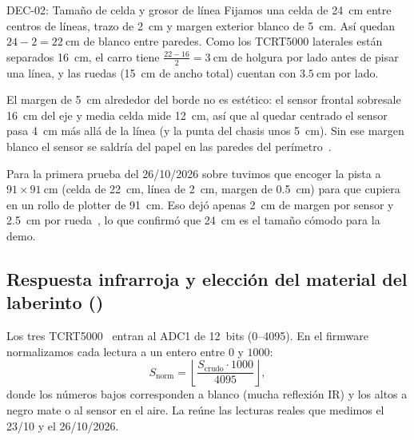 \begin{decision}{DEC-02: Tamaño de celda y grosor de línea}
Fijamos una celda de \SI{24}{\centi\meter} entre centros de líneas, trazo de \SI{2}{\centi\meter} y margen exterior blanco de \SI{5}{\centi\meter}. Así quedan $24 - 2 = \SI{22}{\centi\meter}$ de blanco entre paredes. Como los TCRT5000 laterales están separados \SI{16}{\centi\meter}, el carro tiene $\frac{22 - 16}{2} = \SI{3}{\centi\meter}$ de holgura por lado antes de pisar una línea, y las ruedas (\SI{15}{\centi\meter} de ancho total) cuentan con $\SI{3.5}{\centi\meter}$ por lado.

El margen de \SI{5}{\centi\meter} alrededor del borde no es estético: el sensor frontal sobresale \SI{16}{\centi\meter} del eje y media celda mide \SI{12}{\centi\meter}, así que al quedar centrado el sensor pasa \SI{4}{\centi\meter} más allá de la línea (y la punta del chasis unos \SI{5}{\centi\meter}). Sin ese margen blanco el sensor se saldría del papel en las paredes del perímetro~\cite{arquitectura2026doc}.

Para la primera prueba del 26/10/2026 sobre  tuvimos que encoger la pista a $91 \times \SI{91}{\centi\meter}$ (celda de \SI{22}{\centi\meter}, línea de \SI{2}{\centi\meter}, margen de \SI{0.5}{\centi\meter}) para que cupiera en un rollo de plotter de \SI{91}{\centi\meter}. Eso dejó apenas \SI{2}{\centi\meter} de margen por sensor y \SI{2.5}{\centi\meter} por rueda~\cite{handoff2026doc}, lo que confirmó que \SI{24}{\centi\meter} es el tamaño cómodo para la demo.
\end{decision}

\subsection{Respuesta infrarroja y elección del material del laberinto ()}
\label{subsec:ir-materiales}

Los tres TCRT5000~\cite{vishay2012tcrt5000} entran al ADC1 de 12~bits (\numrange{0}{4095}). En el firmware normalizamos cada lectura a un entero entre $0$ y $1000$:
\begin{equation}
  S_{\text{norm}} = \left\lfloor \frac{S_{\text{crudo}} \cdot 1000}{4095} \right\rfloor,
  \label{eq:adc-norm}
\end{equation}
donde los números bajos corresponden a blanco (mucha reflexión IR) y los altos a negro mate o al sensor en el aire. La  reúne las lecturas reales que medimos el 23/10 y el 26/10/2026.

